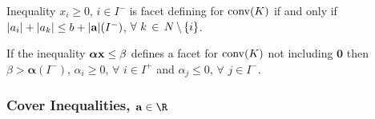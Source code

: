 \documentclass[10pt,twoside]{amsart}
\begin{document}
\begin{prop}
  Inequality $x_i \geq 0$, $i\in I^-$ is facet defining for $\operatorname{conv}(K)$ if and only if $|a_i| + |a_k| \leq b + |\mathbf{a}|(I^-)$, $\forall\,\,k\,\in\, N\,\backslash\,\{i\}$.
\end{prop}

\begin{prop}
  If the inequality $\boldsymbol\alpha\mathbf{x} \leq \beta$ defines a facet for $\operatorname{conv}(K)$ not including $\mathbf{0}$ then $\beta > \boldsymbol\alpha(I^-)$, $\alpha_i \geq 0$, $\forall\,\,i\in I^+$ and $\alpha_j \leq 0$, $\forall\,\,j\in I^-$.
\end{prop}

\subsubsection{Cover Inequalities, $\a \in \R$}\label{sec:gencover}\hfill
\end{document}
